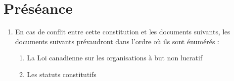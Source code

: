 \section{Préséance}
\label{preseance}

\begin{enumerate}
 \item En cas de conflit entre cette constitution et les documents suivants, les documents suivants prévaudront dans l'ordre où ils sont énumérés :
  \begin{enumerate}
   \item La Loi canadienne sur les organisations à but non lucratif
   \item Les statuts constitutifs
  \end{enumerate}
\end{enumerate}
